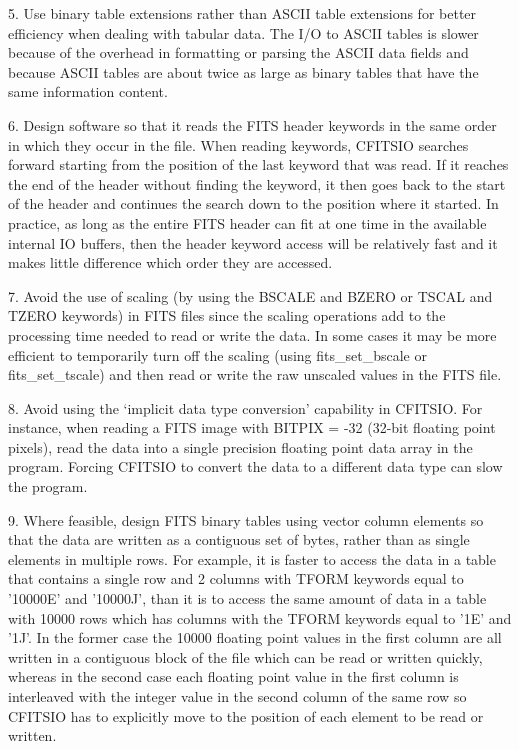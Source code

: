 \documentclass[11pt]{book}
\begin{document}
5.  Use binary table extensions rather than ASCII table
extensions for better efficiency  when dealing with tabular data.  The
I/O to ASCII tables is slower because of the overhead in formatting or
parsing the ASCII data fields and because ASCII tables are about twice
as large as binary tables that have the same information content.

6. Design software so that it reads the FITS header keywords in the
same order in which they occur in the file.  When reading keywords,
CFITSIO searches forward starting from the position of the last keyword
that was read.  If it reaches the end of the header without finding the
keyword, it then goes back to the start of the header and continues the
search down to the position where it started.  In practice, as long as
the entire FITS header can fit at one time in the available internal IO
buffers, then the header keyword access will be relatively fast and it makes
little difference which order they are accessed.

7. Avoid the use of scaling (by using the BSCALE and BZERO or TSCAL and
TZERO keywords) in FITS files since the scaling operations add to the
processing time needed to read or write the data.  In some cases it may
be more efficient to temporarily turn off the scaling (using fits\_set\_bscale or
fits\_set\_tscale) and then read or write the raw unscaled values in the FITS
file.

8. Avoid using the `implicit data type conversion' capability in
CFITSIO.  For instance, when reading a FITS image with BITPIX = -32
(32-bit floating point pixels), read the data into a single precision
floating point data array in the program.  Forcing CFITSIO to convert
the data to a different data type can slow the program.

9. Where feasible, design FITS binary tables using vector column
elements so that the data are written as a contiguous set of bytes,
rather than as single elements in multiple rows.  For example, it is
faster to access the data in a table that contains a single row
and 2 columns with TFORM keywords equal to  '10000E' and '10000J', than
it is to access the same amount of data in a table with 10000 rows
which has columns with the TFORM keywords equal to '1E' and '1J'.  In
the former case the 10000 floating point values in the first column are
all written in a contiguous block of the file which can be read or
written quickly, whereas in the second case each floating point value
in the first column is interleaved with the integer value in the second
column of the same row so CFITSIO has to explicitly move to the
position of each element to be read or written.
\end{document}
